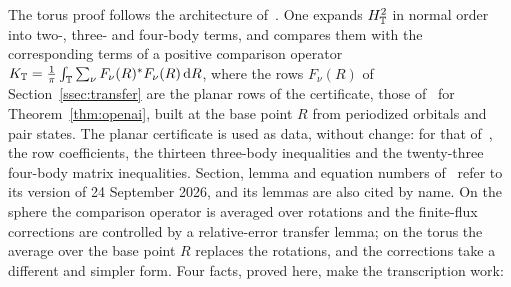 The torus proof follows the architecture
of~\cite{OAI:A-Fock-space-inequality-and-the-Laughlin-spectral-gap-September-24-2026}. One expands $H_{\mathbb{T}}^2$ in normal order into
two-, three- and four-body terms, and compares them with the corresponding terms of a positive comparison operator
$K_{\mathbb{T}}=\frac1\pi\int_{\mathbb{T}}\sum_\nu F_\nu(R)^*F_\nu(R)\,\mathrm{d} R$, where the rows $F_\nu(R)$ of Section~\ref{ssec:transfer} are the planar
rows of the certificate, those of~\cite{OAI:A-Fock-space-inequality-and-the-Laughlin-spectral-gap-September-24-2026} for
Theorem~\ref{thm:openai}, built at the base point $R$ from periodized orbitals and pair states. The planar certificate is used as
data, without change: for that of~\cite{OAI:A-Fock-space-inequality-and-the-Laughlin-spectral-gap-September-24-2026}, the row
coefficients, the thirteen three-body inequalities and the twenty-three four-body matrix inequalities. Section, lemma and equation numbers
of~\cite{OAI:A-Fock-space-inequality-and-the-Laughlin-spectral-gap-September-24-2026} refer to its version of 24 September 2026,
and its lemmas are also cited by name. On the sphere the comparison operator is
averaged over rotations and the finite-flux corrections are controlled by a relative-error transfer lemma; on the torus the
average over the base point $R$ replaces the rotations, and the corrections take a different and simpler form. Four facts,
proved here, make the transcription work:
